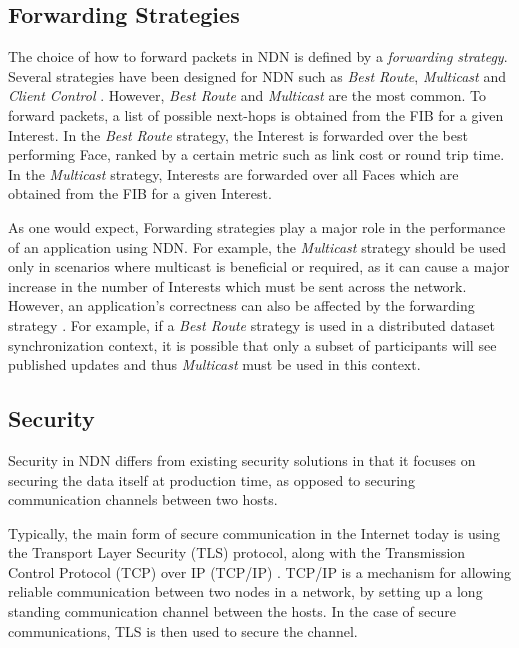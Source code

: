\subsection{Forwarding Strategies}\label{sec:sota:forwarding-strats}
The choice of how to forward packets in NDN is defined by a \textit{forwarding strategy}. Several strategies have been designed for NDN such as \textit{Best Route}, \textit{Multicast} and \textit{Client Control} \cite{ndn-sim-forwarding-strategies}. However, \textit{Best Route} and \textit{Multicast} are the most common. To forward packets, a list of possible next-hops is obtained from the FIB for a given Interest. In the \textit{Best Route} strategy, the Interest is forwarded over the best performing Face, ranked by a certain metric such as link cost or round trip time. In the \textit{Multicast} strategy, Interests are forwarded over all Faces which are obtained from the FIB for a given Interest.

As one would expect, Forwarding strategies play a major role in the performance of an application using NDN. For example, the \textit{Multicast} strategy should be used only in scenarios where multicast is beneficial or required, as it can cause a major increase in the number of Interests which must be sent across the network. However, an application’s correctness can also be affected by the forwarding strategy \cite{forwarding-strategies}. For example, if a \textit{Best Route} strategy is used in a distributed dataset synchronization context, it is possible that only a subset of participants will see published updates and thus \textit{Multicast} must be used in this context.



\subsection{Security}
Security in NDN differs from existing security solutions in that it focuses on securing the data itself at production time, as opposed to securing communication channels between two hosts.  

Typically, the main form of secure communication in the Internet today is using the Transport Layer Security (TLS) protocol, along with the Transmission Control Protocol (TCP) over IP (TCP/IP) \cite{TLS}. TCP/IP is a mechanism for allowing reliable communication between two nodes in a network, by setting up a long standing communication channel between the hosts. In the case of secure communications, TLS is then used to secure the channel. 

